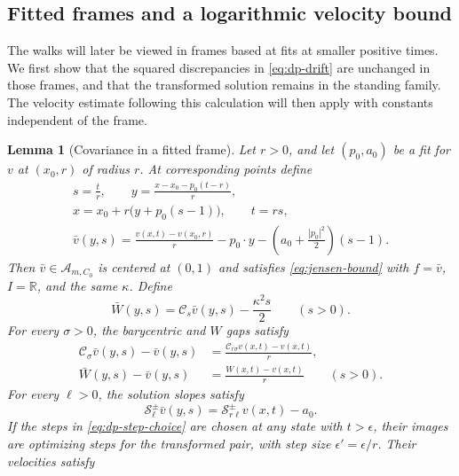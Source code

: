 \documentclass[11pt]{article}
\numberwithin{equation}{section}
\newtheorem{lemma}[theorem]{Lemma}
\theoremstyle{definition}
\theoremstyle{remark}
\newcommand{\R}{\mathbb{R}}
\newcommand{\Cenv}{\mathcal{C}}
\newcommand{\Senv}{\mathcal{S}}
\newcommand{\Aclass}{\mathcal{A}}
\begin{document}
\subsection{Fitted frames and a logarithmic velocity bound}

The walks will later be viewed in frames based at fits at smaller positive
times.  We first show that the squared discrepancies in
\eqref{eq:dp-drift} are unchanged in those frames, and that the transformed
solution remains in the standing family.  The velocity estimate following
this calculation will then apply with constants independent of the frame.

\begin{lemma}[Covariance in a fitted frame]\label{lem:fitted-frame-covariance}
Let $r>0$, and let $(p_0,a_0)$ be a fit for $v$ at $(x_0,r)$ of radius $r$.
At corresponding points define
\begin{equation}\label{eq:contact-frame}
\begin{gathered}
  s=\frac{t}{r},\qquad y=\frac{x-x_0-p_0(t-r)}{r},\\
  x=x_0+r\bigl(y+p_0(s-1)\bigr),\qquad t=rs,\\
  \bar v(y,s)=\frac{v(x,t)-v(x_0,r)}{r}
          -p_0\cdot y-\left(a_0+\frac{|p_0|^2}{2}\right)(s-1).
\end{gathered}
\end{equation}
Then $\bar v\in\Aclass_{m,C_0}$ is centered at $(0,1)$ and satisfies
\eqref{eq:jensen-bound} with $f=\bar v$, $I=\R$, and the same $\kappa$.  Define
\[
  \bar W(y,s)=\Cenv_s\bar v(y,s)-\frac{\kappa^2s}{2}\qquad(s>0).
\]
For every $\sigma>0$, the barycentric and $W$ gaps satisfy
\begin{equation}\label{eq:contact-W-covariance}
\begin{split}
  \Cenv_\sigma\bar v(y,s)-\bar v(y,s)
       &=\frac{\Cenv_{r\sigma}v(x,t)-v(x,t)}{r},\\
  \bar W(y,s)-\bar v(y,s)&=\frac{W(x,t)-v(x,t)}{r}
       \qquad(s>0).
\end{split}
\end{equation}
For every $\ell>0$, the solution slopes satisfy
\begin{equation}\label{eq:fitted-slope-covariance}
  \Senv_\ell^\pm\bar v(y,s)=\Senv_{r\ell}^\pm v(x,t)-a_0.
\end{equation}
If the steps in \eqref{eq:dp-step-choice} are chosen at any state with
$t>\epsilon$, their images are optimizing steps for the transformed pair,
with step size $\epsilon'=\epsilon/r$.  Their velocities satisfy

\end{lemma}
\end{document}
